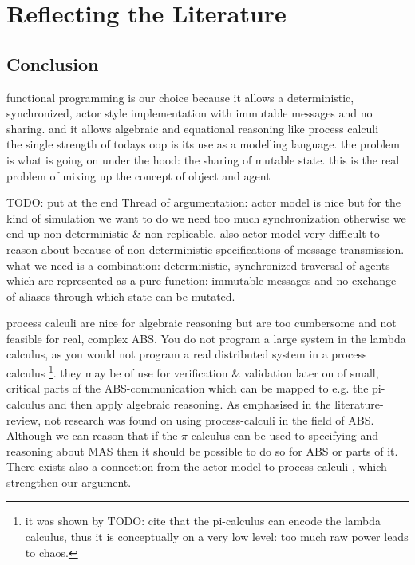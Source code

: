 \chapter{Reflecting the Literature}
\label{chap:refl}

\section{Conclusion}
functional programming is our choice because it allows a deterministic, synchronized, actor style  implementation with  immutable messages and no sharing. and it allows algebraic and equational reasoning like process calculi\\

the single strength of todays oop is its use as a modelling language. the problem is what is going on under the hood: the sharing of mutable state. this is the real problem of mixing up the concept of object and agent

TODO: put at the end
Thread of argumentation: actor model is nice but for the kind of simulation we want to do we need too much synchronization otherwise we end up non-deterministic \& non-replicable. also actor-model very difficult to reason about because of non-deterministic specifications of message-transmission. what we need is a combination: deterministic, synchronized traversal of agents which are represented as a pure function: immutable messages and no exchange of aliases through which state can be mutated.

process calculi are nice for algebraic reasoning but are too cumbersome and not feasible for real, complex ABS. You do not program a large system in the lambda calculus, as you would not program a real distributed system in a process calculus \footnote{it was shown by TODO: cite that the pi-calculus can encode the lambda calculus, thus it is conceptually on a very low level: too much raw power leads to chaos.}. they may be of use for verification \& validation later on of small, critical parts of the ABS-communication which can be mapped to e.g. the pi-calculus and then apply algebraic reasoning.
As emphasised in the literature-review, not research was found on using process-calculi in the field of ABS. Although we can reason that if the $\pi$-calculus can be used to specifying and reasoning about MAS then it should be possible to do so for ABS or parts of it. There exists also a connection from the actor-model to process calculi \cite{agha_foundation_1997}, which strengthen our argument. 

